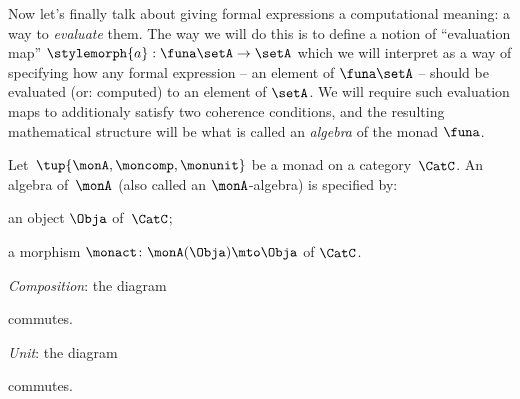 Now let's finally talk about giving formal expressions a computational meaning: a way to \emph{evaluate} them. The way we will do this is to define a notion of ``evaluation map'' $\stylemorph{a}: \funa \setA \to \setA$ which we will interpret as a way of specifying how any formal expression -- an element of $\funa \setA$ -- should be evaluated (or: computed) to an element of $\setA$. We will require such evaluation maps to additionaly satisfy two coherence conditions, and the resulting mathematical structure will be what is called an \emph{algebra} of the monad $\funa$.



\begin{ctdefinition}
    \label{def:algebramon}
Let~$\tup{\monA, \moncomp, \monunit}$ be a monad on a category~$\CatC$. An algebra of~$\monA$ (also called an $\monA$-algebra) is specified by: \

\constit
\begin{compactenum}
\item an object $\Obja$ of~$\CatC$;
\item a morphism $\monact\colon \monA(\Obja) \mto \Obja$ of $\CatC$.
\end{compactenum}
\condit
\begin{compactenum}
\item \emph{Composition}: the diagram
\begin{center}
  \end{center}
commutes.
\item \emph{Unit}: the diagram
\begin{center}
  \end{center}
commutes.
\end{compactenum}
\end{ctdefinition}




